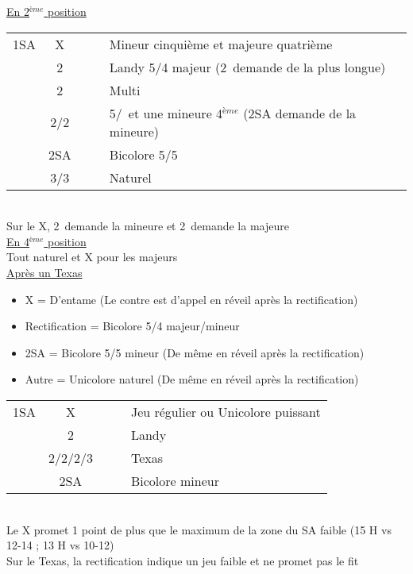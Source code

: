 \documentclass[a4paper, oneside, 11pt]{report}
\begin{document}
	\underline{En 2$^{ème}$ position}
	
	\begin{tabular}{cccc|l}
	1SA & X &&& Mineur cinquième et majeure quatrième\\
	& 2\trefle &&& Landy 5/4 majeur (2\carreau\ demande de la plus longue)\\
	& 2\carreau &&& Multi\\
	& 2\coeur/2\pique &&& 5\coeur/\pique\ et une mineure 4$^{ème}$ (2SA demande de la mineure)\\
	& 2SA &&& Bicolore 5\trefle/5\carreau\\
	& 3\trefle/3\carreau &&& Naturel\\
	\end{tabular}\\
	Sur le X, 2\trefle\ demande la mineure et 2\carreau\ demande la majeure\\
	
	\underline{En 4$^{ème}$ position}\\
	Tout naturel et X pour les majeurs\\

	\underline{Après un Texas}
	
	\begin{itemize}
	\item X = D'entame (Le contre est d'appel en réveil après la rectification)
	\item Rectification = Bicolore 5/4 majeur/mineur
	\item 2SA = Bicolore 5/5 mineur (De même en réveil après la rectification)
	\item Autre = Unicolore naturel (De même en réveil après la rectification)\\
	\end{itemize}

	\begin{tabular}{cccc|l}
	1SA & X &&& Jeu régulier ou Unicolore puissant\\
	& 2\trefle &&& Landy\\
	& 2\carreau/2\coeur/2\pique/3\trefle &&& Texas\\
	& 2SA &&& Bicolore mineur\\
	\end{tabular}\\
	Le X promet 1 point de plus que le maximum de la zone du SA faible (15 H vs 12-14 ; 13 H vs 10-12)\\
	Sur le Texas, la rectification indique un jeu faible et ne promet pas le fit\\
\end{document}

